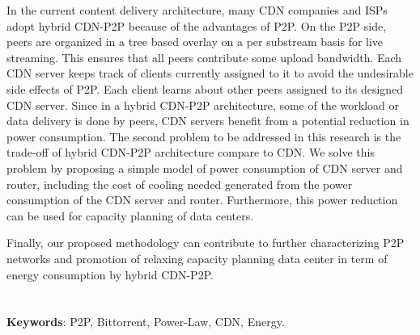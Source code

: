 In the current content delivery architecture, many CDN companies and ISPs adopt hybrid CDN-P2P because of the advantages of P2P. 
On the P2P side, peers are organized in a tree based overlay on a per substream basis for live streaming.   
This ensures that all peers contribute some upload bandwidth. 
Each CDN server keeps track of clients currently assigned to it to avoid the undesirable side effects of P2P.
Each client learns about other peers assigned to its designed CDN server.
Since in a hybrid CDN-P2P architecture, some of the workload or data delivery is done by peers, CDN servers benefit from a potential  reduction in power consumption. 
The second problem to be addressed in this research is the trade-off of hybrid CDN-P2P architecture compare to CDN.
We solve this problem by proposing a simple model of power consumption of CDN server and router, including the cost of cooling needed generated from the power consumption of the CDN server and router. 
Furthermore, this power reduction can be used for capacity planning of data centers. 

Finally, our proposed methodology can contribute to further characterizing P2P networks and promotion of relaxing capacity planning data center in term of energy consumption by hybrid CDN-P2P. 
\\
\\
\\
\textbf{Keywords}: P2P, Bittorrent, Power-Law, CDN, Energy.

